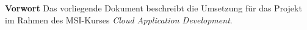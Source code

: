 \documentclass[paper,oneside,onecolumn,notitlepage,bibtotocnumbered,fontsize=12pt,bigheadings,ngerman]{scrartcl}
\newcommand{\sectionnumbering}[1]{%
  \setcounter{section}{0}%
   \renewcommand{\thesection}{\csname #1\endcsname{section}}}
\begin{document}


{\Large \textbf{Vorwort}}
\bigskip
Das vorliegende Dokument beschreibt die Umsetzung für das Projekt im Rahmen des MSI-Kurses \textit{Cloud Application Development}.


\normalsize
\setlength{\parindent}{0pt}
\newpage
\sectionnumbering{Roman} 
\tableofcontents
\clearpage
\listoffigures 
\clearpage 
\listoftables 
\clearpage
{} 
\sectionnumbering{arabic} 









\end{document}

